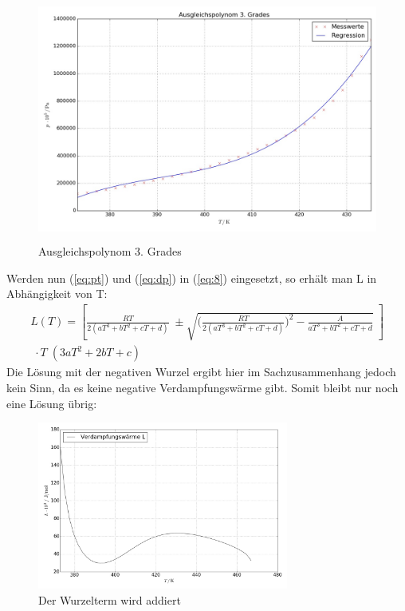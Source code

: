 
\begin{figure}[H] %
  \centering
  \includegraphics[height=8cm]{15bar.jpg}
  \caption{Ausgleichspolynom 3. Grades}
  \label{fig:15}
\end{figure}

Werden nun (\ref{eq:pt}) und (\ref{eq:dp}) in (\ref{eq:8}) eingesetzt, so erhält man
L in Abhängigkeit von T:
\begin{align*}
  L(T) = \left[\frac{RT}{2 (aT^3+bT^2+cT+d)} \; \pm \sqrt{\biggl(\frac{RT}{2(aT^3+bT^2+cT+d)}\biggr)^2
  -\frac{A}{aT^3+bT^2+cT+d}}\; \right] \\
  \;\cdot T \; (3aT^2+2bT+c)
\end{align*}
Die Lösung mit der negativen Wurzel ergibt hier im Sachzusammenhang jedoch kein Sinn,
da es keine negative Verdampfungswärme gibt. Somit bleibt nur noch eine Lösung übrig:
\begin{figure}[H]
  \centering
  \includegraphics[height=5.5cm]{Lplus.jpg}
  \caption{Der Wurzelterm wird addiert}
  \label{fig:plus}
\end{figure}
